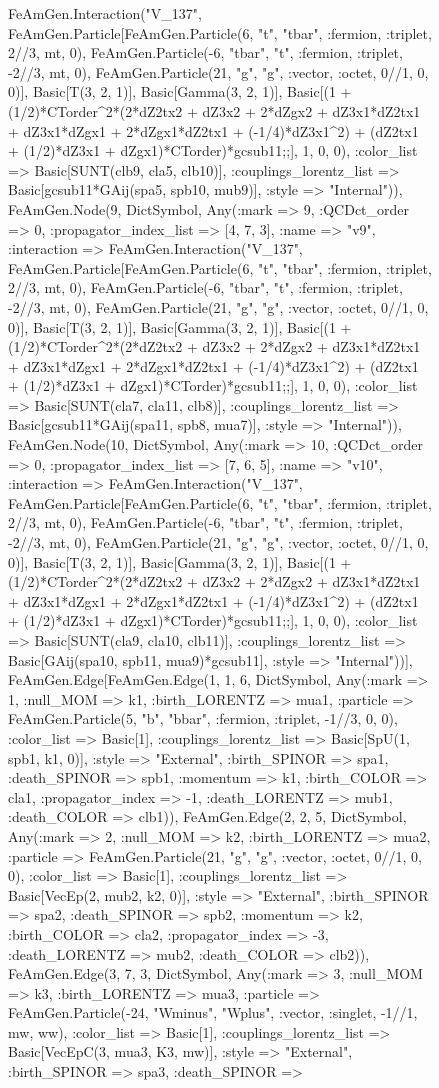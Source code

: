 \documentclass{revtex4}
\begin{document}
\begin{figure}[!htb]
\begin{center}
{FeAmGen.Interaction("V_137", FeAmGen.Particle[FeAmGen.Particle(6, "t", "tbar", :fermion, :triplet, 2//3, mt, 0), FeAmGen.Particle(-6, "tbar", "t", :fermion, :triplet, -2//3, mt, 0), FeAmGen.Particle(21, "g", "g", :vector, :octet, 0//1, 0, 0)], Basic[T(3, 2, 1)], Basic[Gamma(3, 2, 1)], Basic[(1 + (1/2)*CTorder^2*(2*dZ2tx2 + dZ3x2 + 2*dZgx2 + dZ3x1*dZ2tx1 + dZ3x1*dZgx1 + 2*dZgx1*dZ2tx1 + (-1/4)*dZ3x1^2) + (dZ2tx1 + (1/2)*dZ3x1 + dZgx1)*CTorder)*gcsub11;;], 1, 0, 0), :color_list => Basic[SUNT(clb9, cla5, clb10)], :couplings_lorentz_list => Basic[gcsub11*GAij(spa5, spb10, mub9)], :style => "Internal")), FeAmGen.Node(9, Dict{Symbol, Any}(:mark => 9, :QCDct_order => 0, :propagator_index_list => [4, 7, 3], :name => "v9", :interaction => FeAmGen.Interaction("V_137", FeAmGen.Particle[FeAmGen.Particle(6, "t", "tbar", :fermion, :triplet, 2//3, mt, 0), FeAmGen.Particle(-6, "tbar", "t", :fermion, :triplet, -2//3, mt, 0), FeAmGen.Particle(21, "g", "g", :vector, :octet, 0//1, 0, 0)], Basic[T(3, 2, 1)], Basic[Gamma(3, 2, 1)], Basic[(1 + (1/2)*CTorder^2*(2*dZ2tx2 + dZ3x2 + 2*dZgx2 + dZ3x1*dZ2tx1 + dZ3x1*dZgx1 + 2*dZgx1*dZ2tx1 + (-1/4)*dZ3x1^2) + (dZ2tx1 + (1/2)*dZ3x1 + dZgx1)*CTorder)*gcsub11;;], 1, 0, 0), :color_list => Basic[SUNT(cla7, cla11, clb8)], :couplings_lorentz_list => Basic[gcsub11*GAij(spa11, spb8, mua7)], :style => "Internal")), FeAmGen.Node(10, Dict{Symbol, Any}(:mark => 10, :QCDct_order => 0, :propagator_index_list => [7, 6, 5], :name => "v10", :interaction => FeAmGen.Interaction("V_137", FeAmGen.Particle[FeAmGen.Particle(6, "t", "tbar", :fermion, :triplet, 2//3, mt, 0), FeAmGen.Particle(-6, "tbar", "t", :fermion, :triplet, -2//3, mt, 0), FeAmGen.Particle(21, "g", "g", :vector, :octet, 0//1, 0, 0)], Basic[T(3, 2, 1)], Basic[Gamma(3, 2, 1)], Basic[(1 + (1/2)*CTorder^2*(2*dZ2tx2 + dZ3x2 + 2*dZgx2 + dZ3x1*dZ2tx1 + dZ3x1*dZgx1 + 2*dZgx1*dZ2tx1 + (-1/4)*dZ3x1^2) + (dZ2tx1 + (1/2)*dZ3x1 + dZgx1)*CTorder)*gcsub11;;], 1, 0, 0), :color_list => Basic[SUNT(cla9, cla10, clb11)], :couplings_lorentz_list => Basic[GAij(spa10, spb11, mua9)*gcsub11], :style => "Internal"))], FeAmGen.Edge[FeAmGen.Edge(1, 1, 6, Dict{Symbol, Any}(:mark => 1, :null_MOM => k1, :birth_LORENTZ => mua1, :particle => FeAmGen.Particle(5, "b", "bbar", :fermion, :triplet, -1//3, 0, 0), :color_list => Basic[1], :couplings_lorentz_list => Basic[SpU(1, spb1, k1, 0)], :style => "External", :birth_SPINOR => spa1, :death_SPINOR => spb1, :momentum => k1, :birth_COLOR => cla1, :propagator_index => -1, :death_LORENTZ => mub1, :death_COLOR => clb1)), FeAmGen.Edge(2, 2, 5, Dict{Symbol, Any}(:mark => 2, :null_MOM => k2, :birth_LORENTZ => mua2, :particle => FeAmGen.Particle(21, "g", "g", :vector, :octet, 0//1, 0, 0), :color_list => Basic[1], :couplings_lorentz_list => Basic[VecEp(2, mub2, k2, 0)], :style => "External", :birth_SPINOR => spa2, :death_SPINOR => spb2, :momentum => k2, :birth_COLOR => cla2, :propagator_index => -3, :death_LORENTZ => mub2, :death_COLOR => clb2)), FeAmGen.Edge(3, 7, 3, Dict{Symbol, Any}(:mark => 3, :null_MOM => k3, :birth_LORENTZ => mua3, :particle => FeAmGen.Particle(-24, "Wminus", "Wplus", :vector, :singlet, -1//1, mw, ww), :color_list => Basic[1], :couplings_lorentz_list => Basic[VecEpC(3, mua3, K3, mw)], :style => "External", :birth_SPINOR => spa3, :death_SPINOR => }
\end{center}
\end{figure}
\end{document}
